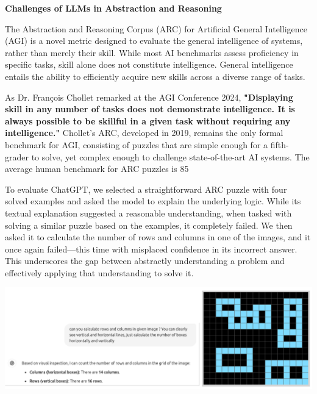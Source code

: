 \documentclass[11pt]{scrartcl}
\begin{document}
\begin{huge}
\textbf{Challenges of LLMs in Abstraction and Reasoning}
\end{huge}
The Abstraction and Reasoning Corpus (ARC) for Artificial General Intelligence (AGI) is a novel metric designed to evaluate the general intelligence of systems, rather than merely their skill. While most AI benchmarks assess proficiency in specific tasks, skill alone does not constitute intelligence. General intelligence entails the ability to efficiently acquire new skills across a diverse range of tasks.

As Dr. François Chollet remarked at the AGI Conference 2024\cite{ref9}, \textbf{"Displaying skill in any number of tasks does not demonstrate intelligence. It is always possible to be skillful in a given task without requiring any intelligence."} Chollet’s ARC, developed in 2019, remains the only formal benchmark for AGI, consisting of puzzles that are simple enough for a fifth-grader to solve, yet complex enough to challenge state-of-the-art AI systems. The average human benchmark for ARC puzzles is 85%

To evaluate ChatGPT, we selected a straightforward ARC puzzle with four solved examples and asked the model to explain the underlying logic. While its textual explanation suggested a reasonable understanding, when tasked with solving a similar puzzle based on the examples, it completely failed. We then asked it to calculate the number of rows and columns in one of the images, and it once again failed—this time with misplaced confidence in its incorrect answer. This underscores the gap between abstractly understanding a problem and effectively applying that understanding to solve it.

\vspace{1cm}

\includegraphics[width=0.99\linewidth, center]{arcagi_1.png}

\vspace{2cm}
\end{document}
